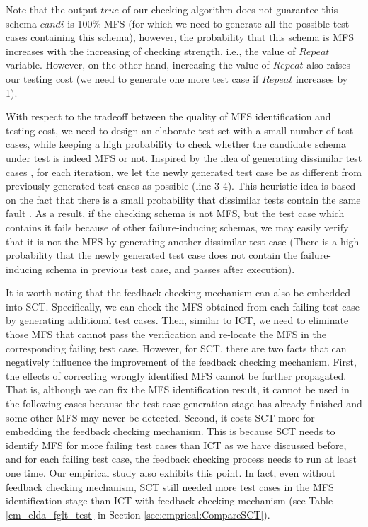 \documentclass[journal,12pt,onecolumn,draftclsnofoot,]{IEEEtran}
\begin{document}
Note that the output $true$ of our checking algorithm does not guarantee this schema $candi$ is 100\% MFS (for which we need to generate all the possible test cases containing this schema), however, the probability that this schema is MFS increases with the increasing of checking strength, i.e., the value of $Repeat$ variable. However, on the other hand, increasing the value of $Repeat$ also raises our testing cost (we need to generate one more test case if $Repeat$ increases by 1).

With respect to the tradeoff between the quality of MFS identification and testing cost, we need to design an elaborate test set with a small number of test cases, while keeping a high probability to check whether the candidate schema under test is indeed MFS or not. Inspired by the idea of generating dissimilar test cases \cite{henard2014bypassing,henard2016comparing}, for each iteration, we let the newly generated test case be as different from previously generated test cases as possible (line 3-4). This heuristic idea is based on the fact that there is a small probability that dissimilar tests contain the same fault \cite{henard2014bypassing}.  As a result, if the checking schema is not MFS, but the test case which contains it fails because of other failure-inducing schemas, we may easily verify that it is not the MFS by generating another dissimilar test case (There is a high probability that the newly generated test case does not contain the failure-inducing schema in previous test case, and passes after execution).


It is worth noting that the  feedback checking mechanism can also be embedded into SCT. Specifically, we can check the MFS obtained from each failing test case by generating additional test cases. Then, similar to ICT, we need to eliminate those MFS that cannot pass the verification and re-locate the MFS in the corresponding failing test case. However, for SCT, there are two facts that can negatively influence  the improvement of the feedback checking mechanism. First, the effects of correcting wrongly identified MFS cannot be further propagated. That is, although we can fix the MFS identification result, it cannot be used in the following cases because the test case generation stage has already finished and some other MFS may never be detected. Second, it costs SCT more for embedding  the  feedback checking mechanism. This is because SCT needs to identify MFS for more failing test cases than ICT as we have discussed before, and for each failing test case, the feedback checking process needs to run at least one time. Our empirical study also exhibits this point. In fact, even without feedback checking mechanism, SCT still needed more test cases in the MFS identification stage than ICT with feedback checking mechanism (see Table \ref{cm_elda_fglt_test} in Section \ref{sec:emprical:CompareSCT}).
\end{document}
